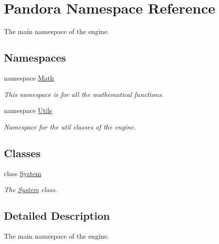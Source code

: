 \hypertarget{namespacePandora}{
\section{Pandora Namespace Reference}
\label{namespacePandora}
}


The main namespace of the engine.  
\subsection*{Namespaces}
\begin{DoxyCompactItemize}
\item 
namespace \hyperlink{namespacePandora_1_1Math}{Math}


\begin{DoxyCompactList}\small\item\em This namespace is for all the mathematical functions. \item\end{DoxyCompactList}\item 
namespace \hyperlink{namespacePandora_1_1Utils}{Utils}


\begin{DoxyCompactList}\small\item\em Namespace for the util classes of the engine. \item\end{DoxyCompactList}\end{DoxyCompactItemize}
\subsection*{Classes}
\begin{DoxyCompactItemize}
\item 
class \hyperlink{classPandora_1_1System}{System}
\begin{DoxyCompactList}\small\item\em The \hyperlink{classPandora_1_1System}{System} class. \item\end{DoxyCompactList}\end{DoxyCompactItemize}


\subsection{Detailed Description}
The main namespace of the engine. 